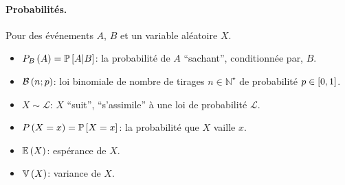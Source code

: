 \documentclass[12pt]{article}
\begin{document}
\paragraph{Probabilités.} Pour des événements $A$, $B$ et un variable aléatoire $X$.
\begin{itemize}
    \item $P_{B}\left(A\right) = \mathbb{P}\left[A \vert B\right]$:
        la probabilité de $A$ \enquote{sachant}, conditionnée par, $B$.
    \item[\Il] $\mathcal{B}\left(n; p\right)$: loi binomiale 
        de nombre de tirages $n \in \mathbb{N}^{\star}$
        de probabilité $p \in \interval{0}{1}$.
    \item[\Il] $X \sim \mathcal{L}$: $X$ \enquote{suit}, \enquote{s'assimile} à 
        une loi de probabilité $\mathcal{L}$.
    \item $P\left(X = x\right) = \mathbb{P}\left[X = x\right]$:
        la probabilité que $X$ vaille $x$.
    \item $\mathbb{E}\left(X\right)$: espérance de $X$.
    \item $\mathbb{V}\left(X\right)$: variance de $X$.
\end{itemize}
\end{document}
